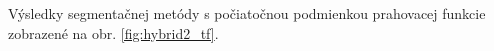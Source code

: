 \documentclass[a4paper,11pt,oneside]{article}%
\begin{document}
Výsledky segmentačnej metódy s počiatočnou podmienkou prahovacej funkcie zobrazené na obr. \ref{fig:hybrid2_tf}.

\begin{figure}[H]  
    \hspace{5px}

\end{figure}
\end{document}
